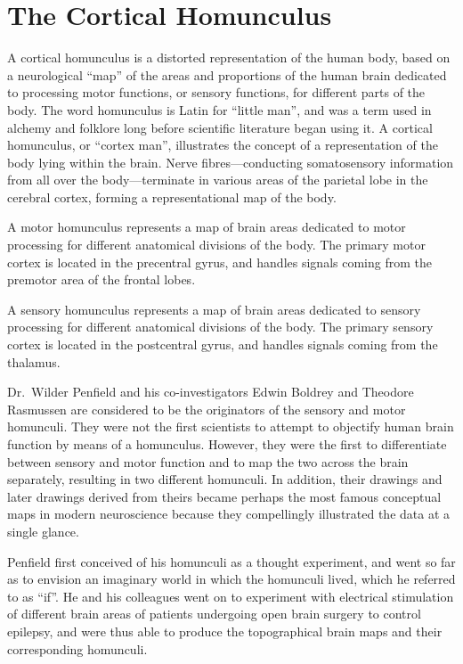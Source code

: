 \hypertarget{the-cortical-homunculus}{%
\section{The Cortical Homunculus}\label{the-cortical-homunculus}}

A cortical homunculus is a distorted representation of the human body, based on a neurological ``map'' of the areas and proportions of the human brain dedicated to processing motor functions, or sensory functions, for different parts of the body. The word homunculus is Latin for ``little man'', and was a term used in alchemy and folklore long before scientific literature began using it. A cortical homunculus, or ``cortex man'', illustrates the concept of a representation of the body lying within the brain. Nerve fibres---conducting somatosensory information from all over the body---terminate in various areas of the parietal lobe in the cerebral cortex, forming a representational map of the body.

A motor homunculus represents a map of brain areas dedicated to motor processing for different anatomical divisions of the body. The primary motor cortex is located in the precentral gyrus, and handles signals coming from the premotor area of the frontal lobes.

A sensory homunculus represents a map of brain areas dedicated to sensory processing for different anatomical divisions of the body. The primary sensory cortex is located in the postcentral gyrus, and handles signals coming from the thalamus.

Dr.~Wilder Penfield and his co-investigators Edwin Boldrey and Theodore Rasmussen are considered to be the originators of the sensory and motor homunculi. They were not the first scientists to attempt to objectify human brain function by means of a homunculus. However, they were the first to differentiate between sensory and motor function and to map the two across the brain separately, resulting in two different homunculi. In addition, their drawings and later drawings derived from theirs became perhaps the most famous conceptual maps in modern neuroscience because they compellingly illustrated the data at a single glance.

Penfield first conceived of his homunculi as a thought experiment, and went so far as to envision an imaginary world in which the homunculi lived, which he referred to as ``if''. He and his colleagues went on to experiment with electrical stimulation of different brain areas of patients undergoing open brain surgery to control epilepsy, and were thus able to produce the topographical brain maps and their corresponding homunculi.

